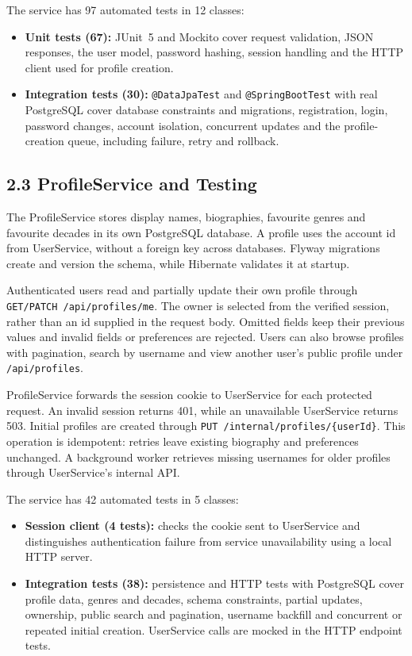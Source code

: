 \documentclass[10pt,a4paper]{article}
\begin{document}
The service has 97 automated tests in 12 classes:
\begin{itemize}
  \item \textbf{Unit tests (67):} JUnit~5 and Mockito cover request validation, JSON responses, the user model, password hashing, session handling and the HTTP client used for profile creation.
  \item \textbf{Integration tests (30):} \texttt{@DataJpaTest} and \texttt{@SpringBootTest} with real PostgreSQL cover database constraints and migrations, registration, login, password changes, account isolation, concurrent updates and the profile-creation queue, including failure, retry and rollback.
\end{itemize}

\subsection*{2.3 ProfileService and Testing}

The ProfileService stores display names, biographies, favourite genres and favourite decades in its own PostgreSQL database. A profile uses the account id from UserService, without a foreign key across databases. Flyway migrations create and version the schema, while Hibernate validates it at startup.

Authenticated users read and partially update their own profile through \texttt{GET/PATCH /api/profiles/me}. The owner is selected from the verified session, rather than an id supplied in the request body. Omitted fields keep their previous values and invalid fields or preferences are rejected. Users can also browse profiles with pagination, search by username and view another user's public profile under \texttt{/api/profiles}.

ProfileService forwards the session cookie to UserService for each protected request. An invalid session returns 401, while an unavailable UserService returns 503. Initial profiles are created through \texttt{PUT /internal/profiles/\{userId\}}. This operation is idempotent: retries leave existing biography and preferences unchanged. A background worker retrieves missing usernames for older profiles through UserService's internal API.

The service has 42 automated tests in 5 classes:
\begin{itemize}
  \item \textbf{Session client (4 tests):} checks the cookie sent to UserService and distinguishes authentication failure from service unavailability using a local HTTP server.
  \item \textbf{Integration tests (38):} persistence and HTTP tests with PostgreSQL cover profile data, genres and decades, schema constraints, partial updates, ownership, public search and pagination, username backfill and concurrent or repeated initial creation. UserService calls are mocked in the HTTP endpoint tests.
\end{itemize}
\end{document}
